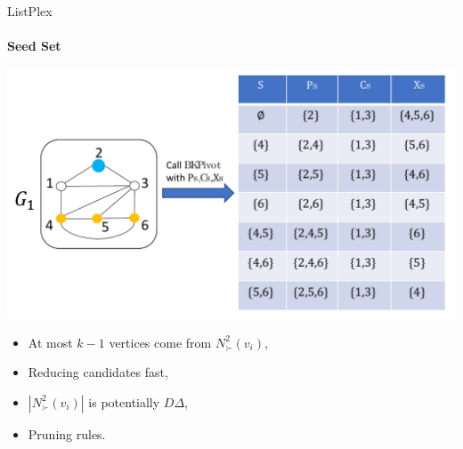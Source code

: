 \documentclass[9pt]{beamer} %
\begin{document}
\begin{frame}{ListPlex}
    \framesubtitle{Seed Set}
    \centering
    \includegraphics[width=0.8\linewidth]{pic/seeds.pdf}
    \begin{minipage}{0.45\linewidth}
        \begin{itemize}
            \item At most $k-1$ vertices come from $N^2_{\succ}(v_i)$,
            \item Reducing candidates fast,
        \end{itemize}
    \end{minipage}
    \begin{minipage}{0.45\linewidth}
        \begin{itemize}
            \item $|N^2_{\succ}(v_i)|$ is potentially $D\Delta$,
            \item Pruning rules.
        \end{itemize}
    \end{minipage}
\end{frame}
\end{document}
